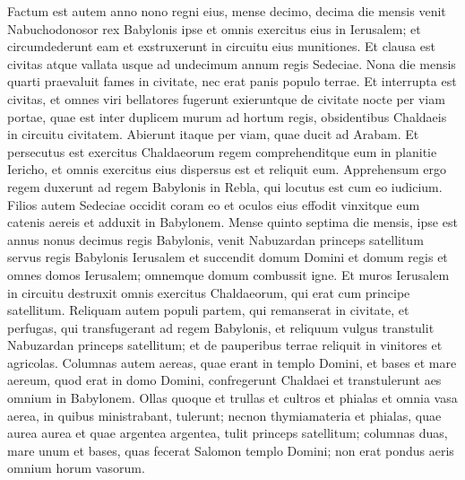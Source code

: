 \begin{biblechapter}
\begin{biblechapter}
\begin{biblechapter}
\begin{biblechapter}
\begin{biblechapter}
\begin{biblechapter}
\begin{biblechapter}
\begin{biblechapter}
\begin{biblechapter}
\begin{biblechapter}
\begin{biblechapter}
\begin{biblechapter}
\begin{biblechapter}
\begin{biblechapter}
\begin{biblechapter}
\begin{biblechapter}
\begin{biblechapter}
\begin{biblechapter}
\begin{biblechapter}
\begin{biblechapter}
\begin{biblechapter}
\begin{biblechapter}
\begin{biblechapter}
\begin{biblechapter}
\begin{biblechapter}
 \verse Factum est autem anno nono regni eius, mense decimo, decima die mensis venit Nabuchodonosor rex Babylonis ipse et omnis exercitus eius in Ierusalem; et circumdederunt eam et exstruxerunt in circuitu eius munitiones. 
\verse Et clausa est civitas atque vallata usque ad undecimum annum regis Sedeciae. 
\verse Nona die mensis quarti praevaluit fames in civitate, nec erat panis populo terrae. 
 \verse Et interrupta est civitas, et omnes viri bellatores fugerunt exieruntque de civitate nocte per viam portae, quae est inter duplicem murum ad hortum regis, obsidentibus Chaldaeis in circuitu civitatem. Abierunt itaque per viam, quae ducit ad Arabam. 
\verse Et persecutus est exercitus Chaldaeorum regem comprehenditque eum in planitie Iericho, et omnis exercitus eius dispersus est et reliquit eum. 
\verse Apprehensum ergo regem duxerunt ad regem Babylonis in Rebla, qui locutus est cum eo iudicium. 
\verse Filios autem Sedeciae occidit coram eo et oculos eius effodit vinxitque eum catenis aereis et adduxit in Babylonem.
 \verse Mense quinto septima die mensis, ipse est annus nonus decimus regis Babylonis, venit Nabuzardan princeps satellitum servus regis Babylonis Ierusalem 
\verse et succendit domum Domini et domum regis et omnes domos Ierusalem; omnemque domum combussit igne. 
\verse Et muros Ierusalem in circuitu destruxit omnis exercitus Chaldaeorum, qui erat cum principe satellitum. 
\verse Reliquam autem populi partem, qui remanserat in civitate, et perfugas, qui transfugerant ad regem Babylonis, et reliquum vulgus transtulit Nabuzardan princeps satellitum; 
\verse et de pauperibus terrae reliquit in vinitores et agricolas. 
\verse Columnas autem aereas, quae erant in templo Domini, et bases et mare aereum, quod erat in domo Domini, confregerunt Chaldaei et transtulerunt aes omnium in Babylonem. 
 \verse Ollas quoque et trullas et cultros et phialas et omnia vasa aerea, in quibus ministrabant, tulerunt; 
\verse necnon thymiamateria et phialas, quae aurea aurea et quae argentea argentea, tulit princeps satellitum; 
\verse columnas duas, mare unum et bases, quas fecerat Salomon templo Domini; non erat pondus aeris omnium horum vasorum. 

\end{biblechapter}
\end{biblechapter}
\end{biblechapter}
\end{biblechapter}
\end{biblechapter}
\end{biblechapter}
\end{biblechapter}
\end{biblechapter}
\end{biblechapter}
\end{biblechapter}
\end{biblechapter}
\end{biblechapter}
\end{biblechapter}
\end{biblechapter}
\end{biblechapter}
\end{biblechapter}
\end{biblechapter}
\end{biblechapter}
\end{biblechapter}
\end{biblechapter}
\end{biblechapter}
\end{biblechapter}
\end{biblechapter}
\end{biblechapter}
\end{biblechapter}
